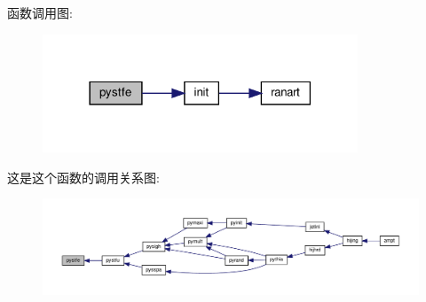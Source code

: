 函数调用图\+:
\nopagebreak
\begin{figure}[H]
\begin{center}
\leavevmode
\includegraphics[width=266pt]{pystfe_8f90_a1cbfd2424f16fcd6b31776c29e2dcee7_cgraph}
\end{center}
\end{figure}
这是这个函数的调用关系图\+:
\nopagebreak
\begin{figure}[H]
\begin{center}
\leavevmode
\includegraphics[width=350pt]{pystfe_8f90_a1cbfd2424f16fcd6b31776c29e2dcee7_icgraph}
\end{center}
\end{figure}
